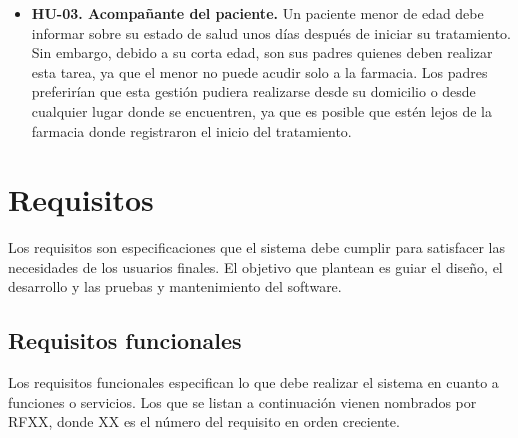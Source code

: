 \begin{itemize}
	\item \textbf{HU-03. Acompañante del paciente.} Un paciente menor de edad debe informar sobre su estado de salud unos días después de iniciar su tratamiento. Sin embargo, debido a su corta edad, son sus padres quienes deben realizar esta tarea, ya que el menor no puede acudir solo a la farmacia. Los padres preferirían que esta gestión pudiera realizarse desde su domicilio o desde cualquier lugar donde se encuentren, ya que es posible que estén lejos de la farmacia donde registraron el inicio del tratamiento.

\end{itemize}


\section{Requisitos}
Los requisitos son especificaciones que el sistema debe cumplir para satisfacer las necesidades de los usuarios finales. El objetivo que plantean es guiar el diseño, el desarrollo y las pruebas y mantenimiento del software. 

\subsection{Requisitos funcionales}
Los requisitos funcionales especifican lo que debe realizar el sistema en cuanto a funciones o servicios. Los que se listan a continuación vienen nombrados por RFXX, donde XX es el número del requisito en orden creciente.

